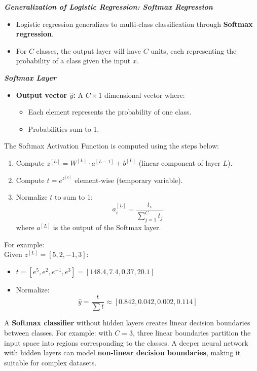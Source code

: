 \documentclass[letterpaper,12pt,notitlepage,twoside]{report}
\begin{document}
\textit{\textbf{Generalization of Logistic Regression: Softmax Regression}}
\begin{itemize}[noitemsep, topsep=0pt]
    \item Logistic regression generalizes to multi-class classification through \textbf{Softmax regression}.
    \item For $C$ classes, the output layer will have $C$ units, each representing the probability of a class given the input $x$.
\end{itemize}

\textit{\textbf{Softmax Layer}}
\begin{itemize}[noitemsep, topsep=0pt]
    \item \textbf{Output vector $\hat{y}$:} A $C \times 1$ dimensional vector where:
    \begin{itemize}
        \item Each element represents the probability of one class.
        \item Probabilities sum to 1.
    \end{itemize}
\end{itemize}

The Softmax Activation Function is computed using the steps below:
\begin{enumerate}[noitemsep, topsep=0pt]
    \item Compute $z^{[L]} = W^{[L]} \cdot a^{[L-1]} + b^{[L]}$ (linear component of layer $L$).
    \item Compute $t = e^{z^{[L]}}$ element-wise (temporary variable).
    \item Normalize $t$ to sum to 1:
    \[
    a^{[L]}_i = \frac{t_i}{\sum_{j=1}^{C} t_j}
    \]
    where $a^{[L]}$ is the output of the Softmax layer.
\end{enumerate}

For example: \\
Given $z^{[L]} = [5, 2, -1, 3]$:
\begin{itemize}
    \item $t = [e^5, e^2, e^{-1}, e^3] = [148.4, 7.4, 0.37, 20.1]$
    \item Normalize: 
    \[
    \hat{y} = \frac{t}{\sum t} \approx [0.842, 0.042, 0.002, 0.114]
    \]
\end{itemize}

A \textbf{Softmax classifier} without hidden layers creates linear decision boundaries between classes. For example: with $C = 3$, three linear boundaries partition the input space into regions corresponding to the classes. A deeper neural network with hidden layers can model \textbf{non-linear decision boundaries}, making it suitable for complex datasets.
\end{document}
